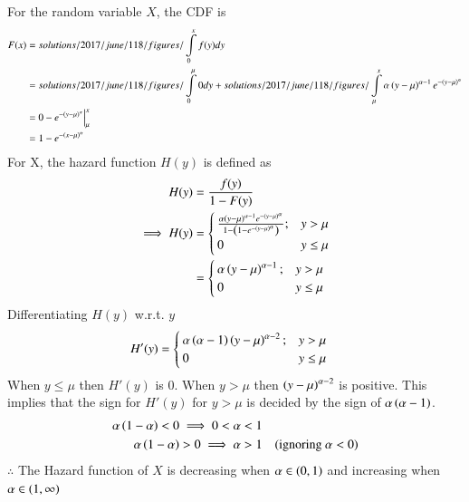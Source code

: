 
\newcommand{\Integral}[2]{solutions/2017/june/118/figures/\ensuremath{\int\limits_{#1}^{#2}}}
For the random variable $X$, the CDF is
\begin{align}
    F(x)&=\Integral{0}{x}f(y)dy\\
        &=\Integral{0}{\mu}0 dy +\Integral{\mu}{x}\alpha\brak{y-\mu}^{\alpha -1}e^{-\brak{y-\mu}^\alpha}\\
        &=0 -e^{-\brak{y-\mu}^\alpha}\Big|_{\mu}^{x}\\
        &=1-e^{-\brak{x-\mu}^{\alpha}}
\end{align}
For X, the hazard function $H(y)$ is defined as
\begin{align}
    H(y)&=\frac{f(y)}{1-F(y)}\nonumber\\
    \implies H(y)&=\begin{cases}\frac{\alpha\left(y-\mu\right)^{\alpha -1}e^{-\left(y-\mu\right)^\alpha}}{1-\left(1-e^{-\left(y-\mu\right)^{\alpha}}\right)};&y>\mu\\
                        0                               &y\leq\mu   
    \end{cases}\nonumber\\
    &=\begin{cases}\alpha\left(y-\mu\right)^{\alpha -1};&y>\mu\\
                        0                            &y\leq\mu   
    \end{cases}\nonumber
\end{align}
Differentiating $H(y)$ w.r.t. $y$
\begin{align}
    H'(y)&=\begin{cases}\alpha\left(\alpha - 1\right)\left(y-\mu\right)^{\alpha -2};&y>\mu\\
                        0                            &y\leq\mu   
    \end{cases}\nonumber
\end{align}
When $y\leq \mu$ then $H'(y)$ is $0$. When $y>\mu$ then $\left(y-\mu\right)^{\alpha -2}$ is positive. This implies that the sign for $H'(y)$ for $y>\mu$ is decided by the sign of $\alpha\left(\alpha -1\right)$.
\begin{align}
    \alpha\left(1-\alpha\right)<0
    \implies 0<\alpha<1\nonumber\\
    \alpha\left(1-\alpha\right)>0\implies \alpha>1 &&\text{(ignoring $\alpha<0$)}\nonumber
\end{align}
$\therefore$ The Hazard function of $X$ is decreasing when $\alpha \in \left(0,1\right)$ and increasing when $\alpha \in \left(1,\infty\right)$
\vspace{0.5cm}\centering {}
